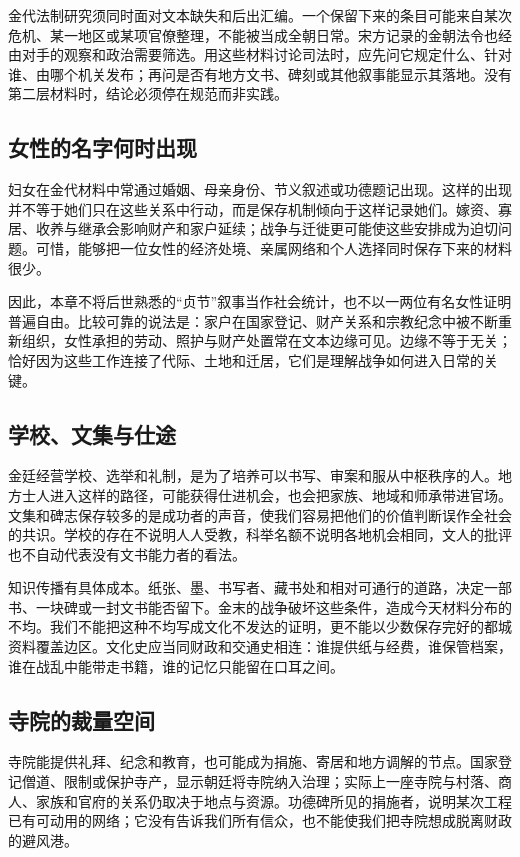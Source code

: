 金代法制研究须同时面对文本缺失和后出汇编。一个保留下来的条目可能来自某次危机、某一地区或某项官僚整理，不能被当成全朝日常。宋方记录的金朝法令也经由对手的观察和政治需要筛选。用这些材料讨论司法时，应先问它规定什么、针对谁、由哪个机关发布；再问是否有地方文书、碑刻或其他叙事能显示其落地。没有第二层材料时，结论必须停在规范而非实践。

\subsection{女性的名字何时出现}

妇女在金代材料中常通过婚姻、母亲身份、节义叙述或功德题记出现。这样的出现并不等于她们只在这些关系中行动，而是保存机制倾向于这样记录她们。嫁资、寡居、收养与继承会影响财产和家户延续；战争与迁徙更可能使这些安排成为迫切问题。可惜，能够把一位女性的经济处境、亲属网络和个人选择同时保存下来的材料很少。

因此，本章不将后世熟悉的“贞节”叙事当作社会统计，也不以一两位有名女性证明普遍自由。比较可靠的说法是：家户在国家登记、财产关系和宗教纪念中被不断重新组织，女性承担的劳动、照护与财产处置常在文本边缘可见。边缘不等于无关；恰好因为这些工作连接了代际、土地和迁居，它们是理解战争如何进入日常的关键。

\subsection{学校、文集与仕途}

金廷经营学校、选举和礼制，是为了培养可以书写、审案和服从中枢秩序的人。地方士人进入这样的路径，可能获得仕进机会，也会把家族、地域和师承带进官场。文集和碑志保存较多的是成功者的声音，使我们容易把他们的价值判断误作全社会的共识。学校的存在不说明人人受教，科举名额不说明各地机会相同，文人的批评也不自动代表没有文书能力者的看法。

知识传播有具体成本。纸张、墨、书写者、藏书处和相对可通行的道路，决定一部书、一块碑或一封文书能否留下。金末的战争破坏这些条件，造成今天材料分布的不均。我们不能把这种不均写成文化不发达的证明，更不能以少数保存完好的都城资料覆盖边区。文化史应当同财政和交通史相连：谁提供纸与经费，谁保管档案，谁在战乱中能带走书籍，谁的记忆只能留在口耳之间。

\subsection{寺院的裁量空间}

寺院能提供礼拜、纪念和教育，也可能成为捐施、寄居和地方调解的节点。国家登记僧道、限制或保护寺产，显示朝廷将寺院纳入治理；实际上一座寺院与村落、商人、家族和官府的关系仍取决于地点与资源。功德碑所见的捐施者，说明某次工程已有可动用的网络；它没有告诉我们所有信众，也不能使我们把寺院想成脱离财政的避风港。

